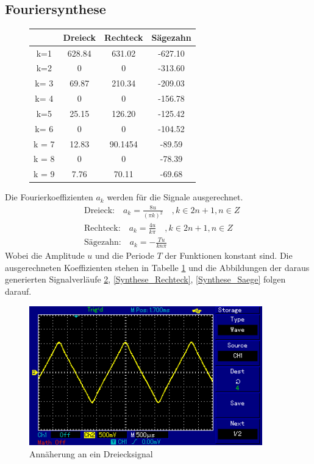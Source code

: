 \subsection{Fouriersynthese}
\begin{figure}[h!]
	\centering
	\begin{tabular}{c|ccc}
		& Dreieck & Rechteck & Sägezahn \\
		\hline
		k=1 & 628.84    & 631.02  & -627.10  \\
		k=2 & 0    & 0  & -313.60  \\
		k= 3 & 69.87  & 210.34  & -209.03  \\
		k= 4 & 0  & 0  & -156.78  \\
		k=5 & 25.15  & 126.20  & -125.42   \\
		k= 6 & 0  & 0  & -104.52  \\
		k = 7 & 12.83  &  90.1454 &  -89.59  \\
		k = 8 & 0 &  0 &  -78.39 \\
		k = 9 & 7.76 &  70.11 &  -69.68 \\
	\end{tabular}
	\label{tab:Koeffizienten}
\end{figure}
Die Fourierkoeffizienten $a_k$ werden für die Signale ausgerechnet.
\begin{align}
&\text{Dreieck:} \quad  a_k = \frac{8u}{(\pi k)^2}  \quad , k \in 2n + 1, n \in Z  \\
&\text{Rechteck:} \quad  a_k = \frac{4u}{k \pi} \quad , k \in 2n + 1, n \in Z \\
&\text{Sägezahn:} \quad a_k = - \frac{Tu}{kn \pi}
\end{align}
Wobei die Amplitude $u$ und die Periode $T$ der Funktionen konstant sind. Die ausgerechneten Koeffizienten stehen in Tabelle \ref{tab:Koeffizienten} und die Abbildungen der daraus generierten Signalverläufe \ref{Synthese_Dreieck}, \ref{Synthese_Rechteck}, \ref{Synthese_Saege} folgen darauf.



\begin{figure}[h!]
	\centering
	\includegraphics[width=0.9\textwidth]{Synthese_Dreieck.png}
	\caption{Annäherung an ein Dreiecksignal}
	\label{Synthese_Dreieck}
\end{figure}



